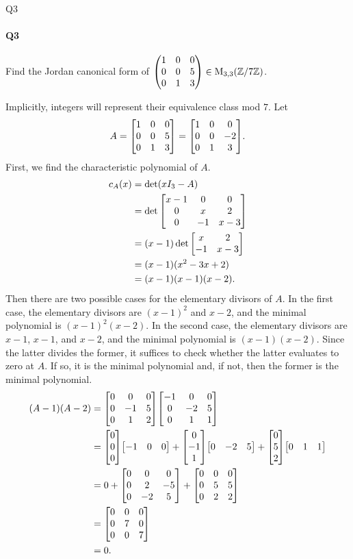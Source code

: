 \documentclass[12pt]{article}
\newenvironment{fullbox}{\begin{lrbox}{\savefullbox}\begin{minipage}{\dimexpr\textwidth-2\fboxsep\relax}}{\end{minipage}\end{lrbox}\begin{center}\framebox[\textwidth]{\usebox{\savefullbox}}\end{center}}
\newenvironment{pbox}[1][]{\begin{fullbox}\ifx#1\empty\else\paragraph{#1}\fi}{\end{fullbox}}
\theoremstyle{definition}
\newcommand{\Z}{\mathbb{Z}}
\newcommand{\Mat}[1]{\operatorname{M}_{#1, #1}}
\begin{document}
\newpage
\begin{pbox}[Q3]
    Find the Jordan canonical form of $\mqty(1 & 0 & 0 \\ 0 & 0 & 5 \\ 0 & 1 & 3) \in \Mat{3}(\Z/7\Z)$.
\end{pbox}

Implicitly, integers will represent their equivalence class mod $7$. Let
\[
    A
        = \mqty[1 & 0 & 0 \\ 0 & 0 & 5 \\ 0 & 1 & 3]
        = \mqty[1 & 0 & 0 \\ 0 & 0 & -2 \\ 0 & 1 & 3].
\]
First, we find the characteristic polynomial of $A$.
\begin{align*}
    c_A(x) 
        &= \det(xI_3 - A) \\
        &= \det\mqty[x - 1 & 0 & 0 \\ 0 & x & 2 \\ 0 & -1 & x - 3] \\
        &= (x - 1)\det\mqty[x & 2 \\ -1 & x - 3] \\
        &= (x - 1)(x^2 - 3x + 2) \\
        &= (x - 1)(x - 1)(x - 2).
\end{align*}
Then there are two possible cases for the elementary divisors of $A$. In the first case, the elementary divisors are $(x - 1)^2$ and $x - 2$, and the minimal polynomial is $(x - 1)^2(x - 2)$. In the second case, the elementary divisors are $x - 1$, $x - 1$, and $x - 2$, and the minimal polynomial is $(x - 1)(x - 2)$. Since the latter divides the former, it suffices to check whether the latter evaluates to zero at $A$. If so, it is the minimal polynomial and, if not, then the former is the minimal polynomial.
\begin{align*}
    (A - 1)(A - 2)
        &= \mqty[0 & 0 & 0 \\ 0 & -1 & 5 \\ 0 & 1 & 2]\mqty[-1 & 0 & 0 \\ 0 & -2 & 5 \\ 0 & 1 & 1] \\
        &= \mqty[0 \\ 0 \\ 0]\mqty[-1 & 0 & 0]
            + \mqty[0 \\ -1 \\ 1]\mqty[0 & -2 & 5]
            + \mqty[0 \\ 5 \\ 2]\mqty[0 & 1 & 1] \\
        &= 0 + \mqty[0 & 0 & 0 \\ 0 & 2 & -5 \\ 0 & -2 & 5] 
            + \mqty[0 & 0 & 0 \\ 0 & 5 & 5 \\ 0 & 2 & 2] \\
        &= \mqty[0 & 0 & 0 \\ 0 & 7 & 0 \\ 0 & 0 & 7] \\
        &= 0.
\end{align*}
\end{document}
